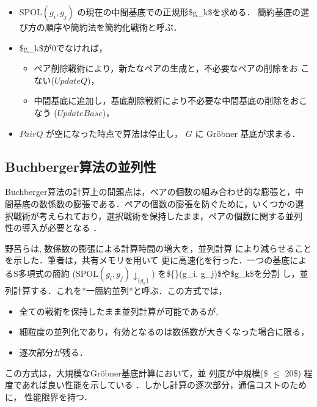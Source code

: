 \documentclass[a4j]{jarticle}
\begin{document}
{\begin{itemize}
\item \({\mathrm{SPOL}}(g_i, g_j)\) の現在の中間基底での正規形\$g\_k\$を求める．
簡約基底の選び方の順序や簡約法を簡約化戦術と呼ぶ．

\item \$g\_k\$が0でなければ，

\begin{itemize}
\item ペア削除戦術により，新たなペアの生成と，不必要なペアの削除をお
こない(\(UpdateQ\))，

\item 中間基底に追加し，基底削除戦術により不必要な中間基底の削除をおこ
なう (\(UpdateBase\))，
\end{itemize}

\item \(PairQ\) が空になった時点で算法は停止し， \(G\) に Gröbner
基底が求まる．
\end{itemize}

\subsection{Buchberger算法の並列性}
\label{sec:orgf541f36}

Buchberger算法の計算上の問題点は，ペアの個数の組み合わせ的な膨張と，中
間基底の数係数の膨張である．ペアの個数の膨張を防ぐために，いくつかの選
択戦術が考えられており，選択戦術を保持したまま，ペアの個数に関する並列
性の導入が必要となる \cite{strategy-accurate}．

野呂ら\cite{noro97-ap}は, 数係数の膨張による計算時間の増大を，並列計算
により減らせることを示した．筆者\cite{asir-para}は，共有メモリを用いて
更に高速化を行った．一つの基底によるS多項式の簡約
(\({{{\mathrm{SPOL}}(g_i, g_j)\!\downarrow_{\{g_k\}}}}\))
を\$\{\}(g\_i, g\_j)\$や\$g\_k\$を分割
し，並列計算する．これを*一簡約並列*と呼ぶ．この方式では，

\begin{itemize}
\item 全ての戦術を保持したまま並列計算が可能であるが,

\item 細粒度の並列化であり，有効となるのは数係数が大きくなった場合に限る，

\item 逐次部分が残る．
\end{itemize}

この方式は，大規模なGröbner基底計算\cite{noro97-mckay}において，並
列度が中規模(\$ \(\le\) 20\$) 程度であれば良い性能を示している
\cite{noro97-ap,asir-para}．しかし計算の逐次部分，通信コストのために，
性能限界を持つ．

}
\end{document}
